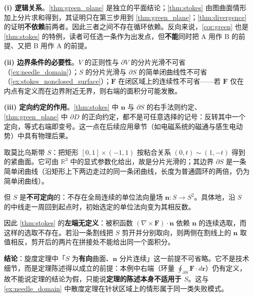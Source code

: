 \begin{remark}[三个积分定理的适用范围与相互推导]\label{rem:integral_theorems_scope}
\textbf{(i) 逻辑关系}。\cref{thm:green_plane} 是独立的平面结论；\cref{thm:stokes} 由图曲面情形加上分片求和得到，其证明只在第三步用到 \cref{thm:green_plane}；\cref{thm:divergence} 的证明\textbf{不依赖}前两者。因此三者之间不存在循环依赖。反向来说，\cref{cor:green} 也是 \cref{thm:stokes} 的特例，读者可任选一条作为出发点，但\textbf{不能}同时把 A 用作 B 的前提、又把 B 用作 A 的前提。

\textbf{(ii) 边界条件的必要性}。$V$ 的正则性与 $\partial V$ 的分片光滑不可省（\cref{ex:needle_domain}）；$S$ 的分片光滑与 $\partial S$ 的简单闭曲线性不可省（\cref{ex:stokes_nonclosed_surface}）；$\mathbf F$ 在闭区域上的连续性不可省——若 $\mathbf F$ 仅在内点有定义而在边界附近无界，则右端的面积分可能发散。

\textbf{(iii) 定向约定的作用}。\cref{thm:stokes} 中 $\mathbf n$ 与 $\partial S$ 的右手法则约定、\cref{thm:green_plane} 中 $\partial D$ 的正向约定，都不是可任意选择的记号：反转其中一个定向，等式右端即变号。这一点在后续应用章节（如电磁系统的磁通与感生电动势）中具有物理后果。
\end{remark}

\begin{example}[反例：不可定向曲面使旋度定理的陈述失效]\label{ex:stokes_nonclosed_surface}
取莫比乌斯带 $S$：把矩形 $[0,1]\times(-1,1)$ 按粘合关系 $(0,t)\sim(1,-t)$ 得到的紧曲面。它可由 $\mathbb R^3$ 中的显式参数化给出，故是分片光滑的；其边界 $\partial S$ 是一条简单闭曲线（沿矩形上下两边走过的同一条闭曲线，长度为普通圆环的两倍，仍为简单闭曲线）。

但 $S$ 是\textbf{不可定向}的：不存在全局连续的单位法向量场 $\mathbf n: S\to S^2$。具体地，沿 $S$ 的中线走一周回到起点时，初始选定的单位法向变为其相反数。

因此 \cref{thm:stokes} 的\textbf{左端无定义}：被积函数 $(\nabla\times\mathbf F)\cdot\mathbf n$ 依赖 $\mathbf n$ 的连续选取，而这样的选取不存在。若沿一条割线把 $S$ 剪开并分别取向，则两侧在割线上的 $\mathbf n$ 取值相反，剪开后的两片在拼接处不能给出同一个面积分。

\textbf{结论}：旋度定理中「$S$ 为\textbf{有向}曲面、$\mathbf n$ 分片连续」这一前提不可省略。它不是技术细节，而是定理陈述得以成立的前提：本例中右端（环量 $\oint_{\partial S}\mathbf F\cdot d\mathbf r$）仍有定义，故不能说定理的结论为假，只能说\textbf{定理的陈述本身不适用于 $S$}。这与 \cref{ex:needle_domain} 中散度定理在针状区域上的情形属于同一类失败模式。
\end{example}

